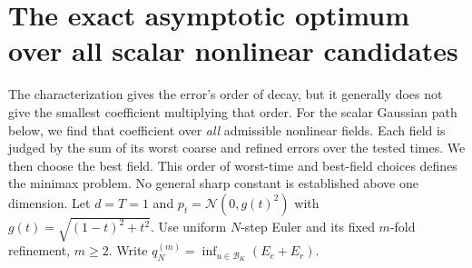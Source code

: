 \section{The exact asymptotic optimum over all scalar nonlinear candidates}
\label{app:sharp-minimax}
The characterization gives the error's order of decay, but it generally
does not give the smallest coefficient multiplying that order.
For the scalar Gaussian path below, we find that coefficient over
\emph{all} admissible nonlinear fields. Each field is judged by the sum of
its worst coarse and refined errors over the tested times. We then choose
the best field. This order of worst-time and best-field choices defines the
minimax problem. No general sharp constant is established above one dimension.
Let $d=T=1$ and $p_t=\mathcal N(0,g(t)^2)$ with
$g(t)=\sqrt{(1-t)^2+t^2}$. Use uniform $N$-step Euler and its fixed
$m$-fold refinement, $m\ge2$. Write $q_N^{(m)}=\inf_{u\in\mathcal B_K}
(E_c+E_r)$.\AIassistance

